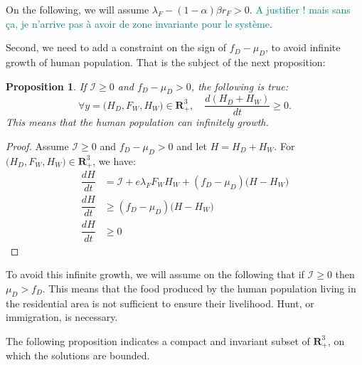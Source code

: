 \documentclass{article}
\newcommand{\lfw}{\lambda_{F}}
\newcommand{\lfw}{\lambda_{F}}
\newcommand{\cI}{\mathcal{I}}
\newcommand{\marc}[1]{\textcolor{teal}{#1}}
\newtheorem{prop}{Proposition}
\begin{document}
On the following, we will assume $\lfw - (1-\alpha) \beta r_F > 0$. \marc{A justifier ! mais sans ça, je n'arrive pas à avoir de zone invariante pour le système}.

Second, we need to add a constraint on the sign of $f_D - \mu_D$, to avoid infinite growth of human population. That is the subject of the next proposition:

\begin{prop}
If $\cI \geq 0$ and $f_D - \mu_D > 0$, the following is true:
$$
\forall	y=\Big(H_D, F_W, H_W\Big) \in \mathbf{R}^3_+, \quad \dfrac{d(H_D + H_W)}{dt} \geq 0.
$$
This means that the human population can infinitely growth.
\end{prop}

\begin{proof}
Assume $\cI \geq 0$ and $f_D - \mu_D > 0$ and let $H = H_D + H_W$. For $\Big(H_D, F_W, H_W\Big) \in \mathbf{R}^3_+$, we have:
\begin{align*}
\dfrac{dH}{dt} &= \cI + e \lfw F_W H_W + (f_D - \mu_D) \Big(H - H_W \Big) \\
\dfrac{dH}{dt} & \geq (f_D - \mu_D) \Big(H - H_W \Big) \\
\dfrac{dH}{dt} & \geq 0
\end{align*}
\end{proof}

To avoid this infinite growth, we will assume on the following that if $\cI \geq 0$ then $\mu_D > f_D$. This means that the food produced by the human population living in the residential area is not sufficient to ensure their livelihood. Hunt, or immigration, is necessary. 

The following proposition indicates a compact and invariant subset of $\mathbf{R}_+^3$, on which the solutions are bounded.
\end{document}
